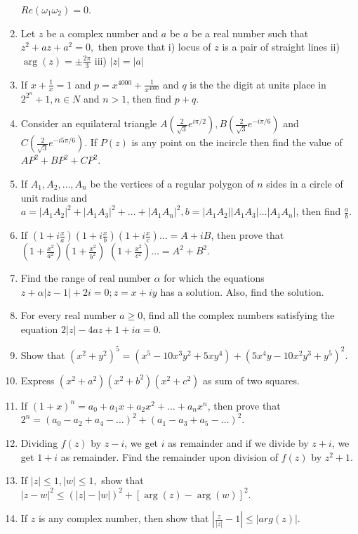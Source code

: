 \begin{enumerate}[resume]
  $Re(\omega_1\omega_2) = 0$.
\item Let $z$ be a complex number and $a$ be $a$ be a real number such that $z^2 + az + a^2 = 0,$ then prove that i)
  locus of $z$ is a pair of straight lines ii) $\arg(z) = \pm\frac{2\pi}{3}$ iii) $|z| = |a|$
\item If $x + \frac{1}{x} = 1$ and $p = x^{4000} + \frac{1}{x^{4000}}$ and $q$ is the the digit at units place in
  $2^{2^n} + 1, n\in N$ and $n > 1$, then find $p + q$.
\item Consider an equilateral triangle $A\left(\frac{2}{\sqrt{3}}e^{i\pi/2}\right),
  B\left(\frac{2}{\sqrt{3}}e^{-i\pi/6}\right)$ and $C\left(\frac{2}{\sqrt{3}}e^{-i5\pi/6}\right)$. If $P(z)$ is any point on the
  incircle then find the value of $AP^2 + BP^2 + CP^2$.
\item If $A_1, A_2, \ldots, A_n$ be the vertices of a regular polygon of $n$ sides in a circle of unit radius and $a =
  |A_1A_2|^2 + |A_1A_3|^2 + \ldots + |A_1A_n|^2, b = |A_1A_2||A_1A_3|\ldots |A_1A_n|$, then find $\frac{a}{b}$.
\item If $\left(1 + i\frac{x}{a}\right)\left(1+ i\frac{x}{b}\right)\left(1 + i\frac{x}{c}\right)\ldots = A + iB$, then
  prove that $\left(1 + \frac{x^2}{a^2}\right)\left(1 + \frac{x^2}{b^2}\right)$
  $\left(1 + \frac{x^2}{c^2}\right) \ldots = A^2 + B^2$.
\item Find the range of real number $\alpha$ for which the equations $z+\alpha|z-1|+2i=0;z=x+iy$ has a solution. Also,
  find the solution.
\item For every real number $a\geq0$, find all the complex numbers satisfying the equation $2|z| - 4az+1+ia=0$.
\item Show that $(x^2 + y^2)^5 = (x^5 - 10x^3y^2 + 5xy^4) + (5x^4y - 10x^2y^3 + y^5)^2$.
\item Express $(x^2+a^2)(x^2+b^2)(x^2+c^2)$ as sum of two squares.
\item If $(1 + x)^n = a_0 + a_1x + a_2x^2 + \ldots + a_nx^n$, then prove that $2^n = (a_0 - a_2 + a_4 - \ldots)^2 + (a_1
  - a_3 + a_5 - \ldots)^2$.
\item Dividing $f(z)$ by $z -i$, we get $i$ as remainder and if we divide by $z+i$, we get $1+i$ as remainder. Find the
  remainder upon division of $f(z)$ by $z^2+1$.
\item If $|z|\leq 1, |w|\leq 1,$ show that $|z - w|^2 \leq (|z| - |w|)^2 + [\arg(z) - \arg(w)]^2$.
\item If $z$ is any complex number, then show that $\left|\frac{z}{|z|} - 1\right| \leq |arg(z)|$.

\end{enumerate}
